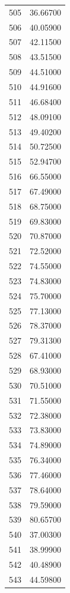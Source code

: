 \documentclass[
  letterpaper,
  DIV=11,
  numbers=noendperiod]{scrreprt}
\begin{document}
\begin{tcolorbox}
\begin{tabular}{lr}
505  &         36.66700 \\
506  &         40.05900 \\
507  &         42.11500 \\
508  &         43.51500 \\
509  &         44.51000 \\
510  &         44.91600 \\
511  &         46.68400 \\
512  &         48.09100 \\
513  &         49.40200 \\
514  &         50.72500 \\
515  &         52.94700 \\
516  &         66.55000 \\
517  &         67.49000 \\
518  &         68.75000 \\
519  &         69.83000 \\
520  &         70.87000 \\
521  &         72.52000 \\
522  &         74.55000 \\
523  &         74.83000 \\
524  &         75.70000 \\
525  &         77.13000 \\
526  &         78.37000 \\
527  &         79.31300 \\
528  &         67.41000 \\
529  &         68.93000 \\
530  &         70.51000 \\
531  &         71.55000 \\
532  &         72.38000 \\
533  &         73.83000 \\
534  &         74.89000 \\
535  &         76.34000 \\
536  &         77.46000 \\
537  &         78.64000 \\
538  &         79.59000 \\
539  &         80.65700 \\
540  &         37.00300 \\
541  &         38.99900 \\
542  &         40.48900 \\
543  &         44.59800 \\

\end{tabular}
\end{tcolorbox}
\end{document}
